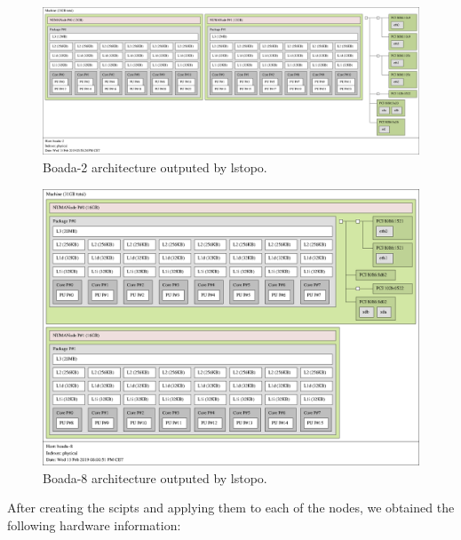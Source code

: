\documentclass[12]{article}
\begin{document}
\begin{figure}[h]
\centering  \includegraphics[width=.8\linewidth]{images/map-2.png}
  \caption{Boada-2 architecture outputed by lstopo.}
  \label{fig:lstopto2}
\end{figure}

\begin{figure}[h]
\centering
  \includegraphics[width=.8\linewidth]{images/map-8.png}
  \caption{Boada-8 architecture outputed by lstopo.}
  \label{fig:lstopto8}
\end{figure}

After creating the scipts and applying them to each of the nodes, we obtained the following hardware information: 
\end{document}
